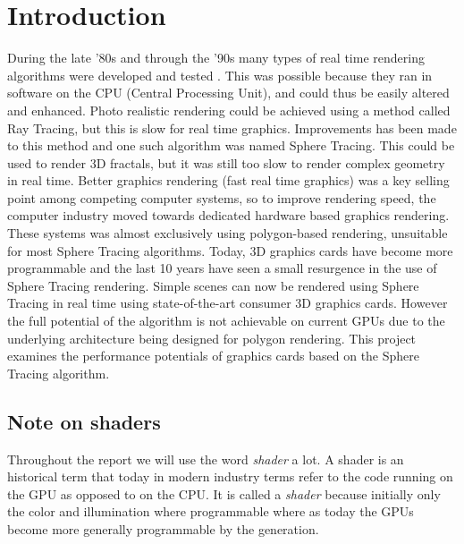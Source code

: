 \chapter{Introduction} 	

	During the late '80s and through the '90s many types of real time rendering
	algorithms were developed and tested \cite{Hart1989}. This was possible
	because they ran in software on the	CPU (Central Processing Unit), and
	could thus be easily altered and enhanced. Photo realistic rendering could
	be achieved using a method called Ray Tracing, but this is slow for real time
	graphics\cite{Shirley2005}. Improvements has been made to this method and one
	such algorithm was named Sphere Tracing. This could be used to render 3D
	fractals\cite{Hart1989}, but it was	still too slow to render complex
	geometry in real time\cite{Hart1989}. Better graphics rendering (fast real
	time graphics) was a key selling point among competing computer systems, so
	to improve rendering speed, the computer industry moved towards dedicated
	hardware based graphics rendering\cite{Houston2010}. These systems was
	almost exclusively using polygon-based	rendering, unsuitable for most
	Sphere Tracing algorithms. Today, 3D graphics cards have become more
	programmable and the last 10 years have seen a small resurgence in the use
	of Sphere Tracing rendering\cite{Quilez2008}. Simple scenes can now be
	rendered using Sphere Tracing in real time using state-of-the-art consumer
	3D graphics cards. However the full potential of the algorithm is not
	achievable on current GPUs due to the underlying architecture being
	designed for polygon rendering\cite{Houston2010}. This project examines the
	performance	potentials of graphics cards based on the Sphere Tracing 
	algorithm.

	\section{Note on shaders} 
		
		Throughout the report we will use the word \emph{shader} a lot. A
		shader is an historical term that today in modern industry terms refer to
		the code running on the GPU as opposed to on the CPU. It is called a
		\emph{shader} because initially only the color and illumination where
		programmable where as today the GPUs become more generally programmable by
		the generation. 

